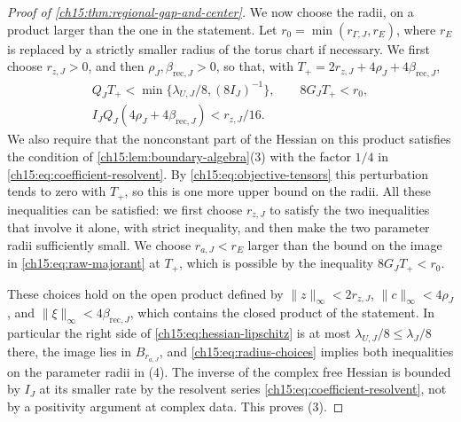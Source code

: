 \begin{proof}[Proof of \cref{ch15:thm:regional-gap-and-center}]
We now choose the radii, on a product larger than the one in the statement. Let $r_0=\min(r_{\Gamma,J},r_E)$, where $r_E$ is replaced by a strictly smaller radius of the torus chart if necessary. We first choose $r_{z,J}>0$, and then $\rho_J,\beta_{\mathrm{rec},J}>0$, so that, with $T_+=2r_{z,J}+4\rho_J+4\beta_{\mathrm{rec},J}$,
\begin{equation}\label{ch15:eq:radius-choices}
 \begin{gathered}
 Q_J T_+<\min\{\lambda_{U,J}/8,(8I_J)^{-1}\},\qquad
                8G_JT_+<r_0,\\
 I_JQ_J(4\rho_J+4\beta_{\mathrm{rec},J})<r_{z,J}/16 .
 \end{gathered}
\end{equation}
We also require that the nonconstant part of the Hessian on this product satisfies the condition of \cref{ch15:lem:boundary-algebra}(3) with the factor $1/4$ in \eqref{ch15:eq:coefficient-resolvent}. By \eqref{ch15:eq:objective-tensors} this perturbation tends to zero with $T_+$, so this is one more upper bound on the radii. All these inequalities can be satisfied: we first choose $r_{z,J}$ to satisfy the two inequalities that involve it alone, with strict inequality, and then make the two parameter radii sufficiently small. We choose $r_{a,J}<r_E$ larger than the bound on the image in \eqref{ch15:eq:raw-majorant} at $T_+$, which is possible by the inequality $8G_JT_+<r_0$.

These choices hold on the open product defined by $\|z\|_\infty<2r_{z,J}$, $\|c\|_\infty<4\rho_J$, and $\|\xi\|_\infty<4\beta_{\mathrm{rec},J}$, which contains the closed product of the statement. In particular the right side of \eqref{ch15:eq:hessian-lipschitz} is at most $\lambda_{U,J}/8\le\lambda_J/8$ there, the image lies in $B_{r_{a,J}}$, and \eqref{ch15:eq:radius-choices} implies both inequalities on the parameter radii in (4). The inverse of the complex free Hessian is bounded by $I_J$ at its smaller rate by the resolvent series \eqref{ch15:eq:coefficient-resolvent}, not by a positivity argument at complex data. This proves (3).


\end{proof}
